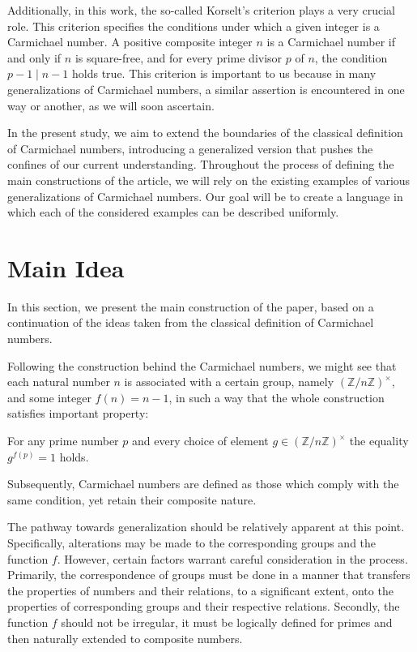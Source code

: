 \documentclass{article}
\theoremstyle{definition}
\theoremstyle{definition}
\begin{document}
Additionally, in this work, the so-called Korselt's criterion plays a very crucial role. This criterion specifies the conditions under which a given integer is a Carmichael number. A positive composite integer $n$ is a Carmichael number if and only if $n$ is square-free, and for every prime divisor $p$ of $n$, the condition $p-1 \mid n-1$ holds true. This criterion is important to us because in many generalizations of Carmichael numbers, a similar assertion is encountered in one way or another, as we will soon ascertain.

In the present study, we aim to extend the boundaries of the classical definition of Carmichael numbers, introducing a generalized version that pushes the confines of our current understanding. Throughout the process of defining the main constructions of the article, we will rely on the existing examples of various generalizations of Carmichael numbers. Our goal will be to create a language in which each of the considered examples can be described uniformly.

\newpage



\section {Main Idea}
In this section, we present the main construction of the paper, based on a continuation of the ideas taken from the classical definition of Carmichael numbers.

Following the construction behind the Carmichael numbers, we might see that each natural number $n$ is associated with a certain group, namely $(\mathbb{Z}/n\mathbb{Z})^\times$, and some integer $f(n)=n-1$, in such a way that the whole construction satisfies important property:
\begin{center}
    For any prime number $p$ and every choice of element $g \in (\mathbb{Z}/n\mathbb{Z})^\times$ the equality $g^{f(p)}=1$ holds.
\end{center}
Subsequently, Carmichael numbers are defined as those which comply with the same condition, yet retain their composite nature.

The pathway towards generalization should be relatively apparent at this point. Specifically, alterations may be made to the corresponding groups and the function $f$. However, certain factors warrant careful consideration in the process. Primarily, the correspondence of groups must be done in a manner that transfers the properties of numbers and their relations, to a significant extent, onto the properties of corresponding groups and their respective relations. Secondly, the function $f$ should not be irregular, it must be logically defined for primes and then naturally extended to composite numbers.
\end{document}
